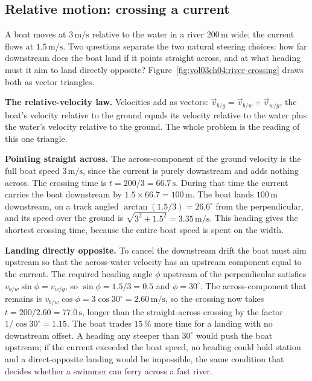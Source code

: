 \subsection{Relative motion: crossing a current}

A boat moves at $3\,\si{\meter\per\second}$ relative to the water in a
river $200\,\si{\meter}$ wide; the current flows at $1.5\,\si{\meter\per
\second}$. Two questions separate the two natural steering choices: how
far downstream does the boat land if it points straight across, and at
what heading must it aim to land directly opposite?
Figure~\ref{fig:vol03ch04:river-crossing} draws both as vector
triangles.

\textbf{The relative-velocity law.} Velocities add as vectors:
$\vec{v}_{b/g}=\vec{v}_{b/w}+\vec{v}_{w/g}$, the boat's velocity
relative to the ground equals its velocity relative to the water plus
the water's velocity relative to the ground. The whole problem is the
reading of this one triangle.

\textbf{Pointing straight across.} The across-component of the ground
velocity is the full boat speed $3\,\si{\meter\per\second}$, since the
current is purely downstream and adds nothing across. The crossing time
is $t=200/3=66.7\,\si{\second}$. During that time the current carries
the boat downstream by $1.5\times 66.7=100\,\si{\meter}$. The boat
lands $100\,\si{\meter}$ downstream, on a track angled $\arctan(1.5/3)=
26.6^{\circ}$ from the perpendicular, and its speed over the ground is
$\sqrt{3^{2}+1.5^{2}}=3.35\,\si{\meter\per\second}$. This heading gives
the shortest crossing time, because the entire boat speed is spent on
the width.

\textbf{Landing directly opposite.} To cancel the downstream drift the
boat must aim upstream so that the across-water velocity has an
upstream component equal to the current. The required heading angle
$\phi$ upstream of the perpendicular satisfies $v_{b/w}\sin\phi=
v_{w/g}$, so $\sin\phi=1.5/3=0.5$ and $\phi=30^{\circ}$. The
across-component that remains is $v_{b/w}\cos\phi=3\cos 30^{\circ}=
2.60\,\si{\meter\per\second}$, so the crossing now takes $t=200/2.60=
77.0\,\si{\second}$, longer than the straight-across crossing by the
factor $1/\cos 30^{\circ}=1.15$. The boat trades $15\,\%$ more time for
a landing with no downstream offset. A heading any steeper than
$30^{\circ}$ would push the boat upstream; if the current exceeded the
boat speed, no heading could hold station and a direct-opposite landing
would be impossible, the same condition that decides whether a swimmer
can ferry across a fast river.

